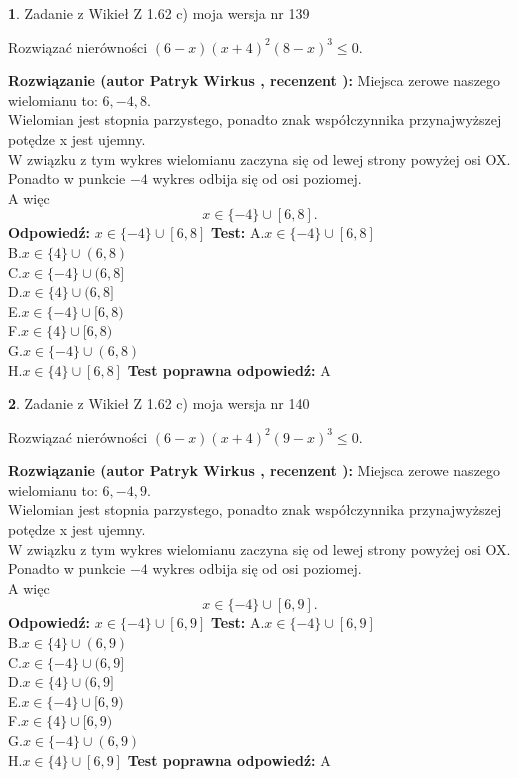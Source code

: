 \documentclass[12pt, a4paper]{article}
\theoremstyle{definition} %
\newtheorem{zad}{}
\newcommand{\zadStart}[1]{\begin{zad}#1\newline}
\newcommand{\zadStop}{\end{zad}}
\newcommand{\rozwStart}[2]{\noindent \textbf{Rozwiązanie (autor #1 , recenzent #2): }\newline}
\newcommand{\rozwStop}{\newline}
\newcommand{\odpStart}{\noindent \textbf{Odpowiedź:}\newline}
\newcommand{\odpStop}{\newline}
\newcommand{\testStart}{\noindent \textbf{Test:}\newline}
\newcommand{\testStop}{\newline}
\newcommand{\kluczStart}{\noindent \textbf{Test poprawna odpowiedź:}\newline}
\newcommand{\kluczStop}{\newline}
\begin{document}
\zadStart{Zadanie z Wikieł Z 1.62 c) moja wersja nr 139}

Rozwiązać nierówności $(6-x)(x+4)^{2}(8-x)^{3}\le0$.
\zadStop
\rozwStart{Patryk Wirkus}{}
Miejsca zerowe naszego wielomianu to: $6, -4, 8$.\\
Wielomian jest stopnia parzystego, ponadto znak współczynnika przy\linebreak najwyższej potędze x jest ujemny.\\ W związku z tym wykres wielomianu zaczyna się od lewej strony powyżej osi OX.\\
Ponadto w punkcie $-4$ wykres odbija się od osi poziomej.\\
A więc $$x \in \{-4\} \cup [6,8].$$
\rozwStop
\odpStart
$x \in \{-4\} \cup [6,8]$
\odpStop
\testStart
A.$x \in \{-4\} \cup [6,8]$\\
B.$x \in \{4\} \cup (6,8)$\\
C.$x \in \{-4\} \cup (6,8]$\\
D.$x \in \{4\} \cup (6,8]$\\
E.$x \in \{-4\} \cup [6,8)$\\
F.$x \in \{4\} \cup [6,8)$\\
G.$x \in \{-4\} \cup (6,8)$\\
H.$x \in \{4\} \cup [6,8]$
\testStop
\kluczStart
A
\kluczStop



\zadStart{Zadanie z Wikieł Z 1.62 c) moja wersja nr 140}

Rozwiązać nierówności $(6-x)(x+4)^{2}(9-x)^{3}\le0$.
\zadStop
\rozwStart{Patryk Wirkus}{}
Miejsca zerowe naszego wielomianu to: $6, -4, 9$.\\
Wielomian jest stopnia parzystego, ponadto znak współczynnika przy\linebreak najwyższej potędze x jest ujemny.\\ W związku z tym wykres wielomianu zaczyna się od lewej strony powyżej osi OX.\\
Ponadto w punkcie $-4$ wykres odbija się od osi poziomej.\\
A więc $$x \in \{-4\} \cup [6,9].$$
\rozwStop
\odpStart
$x \in \{-4\} \cup [6,9]$
\odpStop
\testStart
A.$x \in \{-4\} \cup [6,9]$\\
B.$x \in \{4\} \cup (6,9)$\\
C.$x \in \{-4\} \cup (6,9]$\\
D.$x \in \{4\} \cup (6,9]$\\
E.$x \in \{-4\} \cup [6,9)$\\
F.$x \in \{4\} \cup [6,9)$\\
G.$x \in \{-4\} \cup (6,9)$\\
H.$x \in \{4\} \cup [6,9]$
\testStop
\kluczStart
A
\kluczStop
\end{document}
